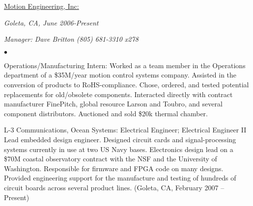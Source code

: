 \documentclass[letterpaper, 10pt]{article}
\begin{document}
\par \smallskip \smallskip
\noindent \underline{Motion Engineering, Inc:} \vspace{0.4em} \\
%
\noindent \begin{minipage}[t]{0.5\textwidth}
\begin{flushleft} 
\textit{Goleta, CA, June 2006-Present}\\
\end{flushleft}
\end{minipage}
\noindent \begin{minipage}[t]{0.5\textwidth}
\begin{flushright} 
\textit{Manager: Dave Britton (805) 681-3310 x278}\\
\end{flushright}
\end{minipage}
%
\noindent \begin{minipage}[t]{\widthof{$\bullet$}}
\begin{flushleft} 
$\bullet$
\end{flushleft}
\end{minipage}
\newskip{\mylength}
\setlength{\mylength}{\widthof{$\bullet$}}%
\noindent \begin{minipage}[t]{\dimexpr \textwidth - 1.2\mylength \relax}
Operations/Manufacturing Intern: Worked as a team member in the Operations department of a \$35M/year motion control systems company. Assisted in the conversion of products to RoHS-compliance. Chose, ordered, and tested potential replacements for old/obsolete components. Interacted directly with contract manufacturer FinePitch, global resource Larson and Toubro, and several component distributors. Auctioned and sold \$20k thermal chamber.
\end{minipage}
\par
\bigskip
{}
\par
L-3 Communications, Ocean Systems:	Electrical Engineer; Electrical Engineer II\\
Lead embedded design engineer. Designed circuit cards and signal-processing systems currently in use at two US Navy bases. Electronics design lead on a \$70M coastal observatory contract with the NSF and the University of Washington. Responsible for firmware and FPGA code on many designs. Provided engineering support for the manufacture and testing of hundreds of circuit boards across several product lines. (Goleta, CA, February 2007 – Present)
\end{document}
